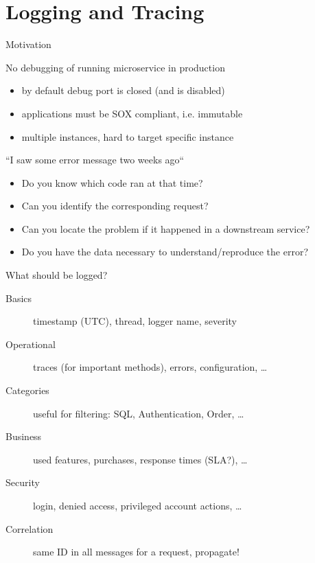 \part{Logging and Tracing}

\begin{frame}{Motivation}

    \begin{block}{No debugging of running microservice in production}
            \begin{itemize}
                \item by default debug port is closed (and  is disabled) 
                \item applications must be SOX compliant, i.e. immutable
                \item multiple instances, hard to target specific instance
            \end{itemize}
    \end{block}

	\begin{block}{``I saw some error message two weeks ago``}
	    \begin{itemize}
            \item Do you know which code ran at that time?
            \item Can you identify the corresponding request?
            \item Can you locate the problem if it happened in a downstream service?
            \item Do you have the data necessary to understand/reproduce the error?
	    \end{itemize}
    \end{block}
\end{frame}

\begin{frame}{What should be logged?}
	\begin{description}
		\item[Basics] timestamp (UTC), thread, logger name, severity
		\item[Operational] traces (for important methods), errors, configuration, \ldots{}
		\item[Categories] useful for filtering: SQL, Authentication, Order, \ldots{}
		\item[Business] used features, purchases, response times (SLA?), \ldots{}
		\item[Security] login, denied access, privileged account actions, \ldots{}
		\item[Correlation] same ID in all messages for a request, propagate!
	\end{description}

    \vfill
\end{frame}

